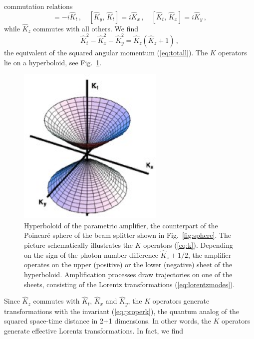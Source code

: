 \documentclass[12pt,amsmath,amssymb]{article}
\numberwithin{equation}{section}
\begin{document}
commutation relations
\begin{equation}
[\hat{K}_x,\,\hat{K}_y]=-i\hat{K}_t \,,\quad
[\hat{K}_y,\,\hat{K}_t]=i\hat{K}_x \,,\quad
[\hat{K}_t,\,\hat{K}_x]=i\hat{K}_y \,,
\end{equation}
while $\hat{K}_z$ commutes with all others. We find
\begin{equation}
\label{eq:properk} \hat{K}_t^2 - \hat{K}_x^2 - \hat{K}_y^2 =
\hat{K}_z(\hat{K}_z + 1) \,,
\end{equation}
the equivalent of the squared angular momentum (\ref{eq:totall}).
The $K$ operators lie on a hyperboloid, see Fig.\ \ref{fig:hyper}.
\begin{figure}
\begin{center}
\includegraphics[width=7cm]{fig3.eps}
\end{center}
\caption{\label{fig:hyper}
Hyperboloid of the parametric amplifier, the counterpart of the
Poincar\'e sphere of the beam splitter shown in Fig.\ \ref{fig:sphere}.
The picture schematically illustrates the $K$ operators
(\ref{eq:k}).
Depending on the sign of the photon-number difference
$\hat{K}_z+1/2$, the amplifier operates on the upper (positive)
or the lower (negative) sheet of the hyperboloid.
Amplification processes draw trajectories on one
of the sheets, consisting of the Lorentz transformations
(\ref{eq:lorentzmodes}).}
\end{figure}
Since $\hat{K}_z$ commutes with $\hat{K}_t$, $\hat{K}_x$ and
$\hat{K}_y$, the $K$ operators generate transformations with the
invariant (\ref{eq:properk}), the quantum analog of the squared
space-time distance \cite{LL2} in 2+1 dimensions. In other words,
the $K$ operators generate effective Lorentz transformations. In
fact, we find
\end{document}
